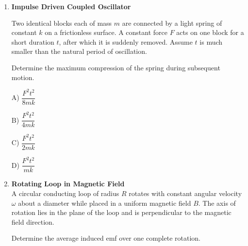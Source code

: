 \documentclass[12pt]{article}
\begin{document}
\begin{enumerate}
Determine how the angular frequency of oscillation depends parametrically on $\alpha$ and $\beta$.

A) Proportional to $\sqrt{\beta}$

B) Proportional to $\beta$

C) Proportional to $\sqrt{\alpha}$

D) Proportional to $\sqrt{\dfrac{\beta^2}{\alpha}}$

\item \textbf{Impulse Driven Coupled Oscillator}

Two identical blocks each of mass $m$ are connected by a light spring of constant $k$ on a frictionless surface. A constant force $F$ acts on one block for a short duration $t$, after which it is suddenly removed. Assume $t$ is much smaller than the natural period of oscillation.

Determine the maximum compression of the spring during subsequent motion.

A) $\dfrac{F^2t^2}{8mk}$

B) $\dfrac{F^2t^2}{4mk}$

C) $\dfrac{F^2t^2}{2mk}$

D) $\dfrac{F^2t^2}{mk}$

\item \textbf{Rotating Loop in Magnetic Field} \\ 


A circular conducting loop of radius $R$ rotates with constant angular velocity $\omega$ about a diameter while placed in a uniform magnetic field $B$. The axis of rotation lies in the plane of the loop and is perpendicular to the magnetic field direction.

Determine the average induced emf over one complete rotation.

\begin{center}
\end{center}


\end{enumerate}
\end{document}
